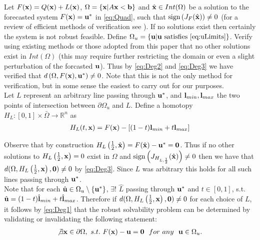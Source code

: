Let $F(\bold x)=Q(\bold x)+L(\bold x)$, $\Omega=\{\bold x| A\bold x< \bold b\}$ and $\hat{\bold x}\in Int(\Omega)$ be a solution to the forecasted system $F(\bold x)=\bold u^*$ in \ref{eq:Quad}, such that $\operatorname{sign}\left(J_{F}(\hat{\bold x})\right)\neq 0$ (for a review of efficient methods of verification see \cite{GRIEWANK2014}). 
If no solutions exist then certainly the system is not robust feasible. Define $\Omega_u=\{\bold u| \bold u\text{ satisfies }\ref{eq:uLimits}\}$.
Verify using existing methods or those adopted from this paper that no other solutions exist in $Int(\Omega)$ (this may require further restricting the domain or even a slight perturbation of the forcasted $\bold u$). 
Thus by \ref{eq:Deg2} and \ref{eq:Deg3} we have verified that $d\left(\Omega, F(\bold x), \bold u^*\right)\neq 0$. 
Note that this is not the only method for verification, but in some sense the easiest to carry out for our purposes. \\

Let $L$ represent an arbitrary line passing through $\bold u^*$, and $\bold l_{min},\bold l_{max}$ the two points of intersection between $\partial\Omega_u$ and $L$. 
Define a homotopy $H_L : [0,1]\times\bar{\Omega}\rightarrow\mathbb{R}^n$ as 
\begin{align}
H_L(t,\bold x) = F(\bold x)-\left[(1-t)\bold l_{min}+t\bold l_{max}\right] \label{eq:Homo}
\end{align}

Observe that by construction $H_L\left(\frac{1}{2},\hat{\bold x}\right)=F(\hat{\bold x})-\bold u^*=\textbf{0}$. 
Thus if no other solutions to $H_L\left(\frac{1}{2},\bold x\right)=0$ exist in $\Omega$ and $\operatorname{sign}\left(J_{H_{L,\frac{1}{2}}}(\hat{\bold x})\right)\neq 0$ then we have that $d(\Omega,H_L\left(\frac{1}{2},\bold x\right),\textbf{0})\neq 0$ by \ref{eq:Deg3}. 
Since $L$ was arbitrary this holds for all such lines passing through $\bold u^*$.\\
Note that for each $\hat{\bold u}\in\Omega_u\setminus\{\bold u^*\}$, $\exists !$ $\hat{L}$ passing through $\bold u^*$ and $t\in[0,1]$,  s.t. $\hat{\bold u}=(1-t)\hat{\bold l}_{min}+t\hat{\bold l}_{max}$. 
Therefore if $d(\Omega,H_L\left(\frac{1}{2},\bold x\right),\bold 0)\neq 0$ for each choice of $L$, it follows by \ref{eq:Deg1} that the robust solvability problem can be determined by validating or invalidating the following statement:
\begin{align}
\not\exists \bold x\in\partial\Omega, \ s.t. \ F(\bold x)-\bold u=\bold 0	 \ \ for \ any \ \ \bold u\in\Omega_u. \label{eq:RSForm}
\end{align}

